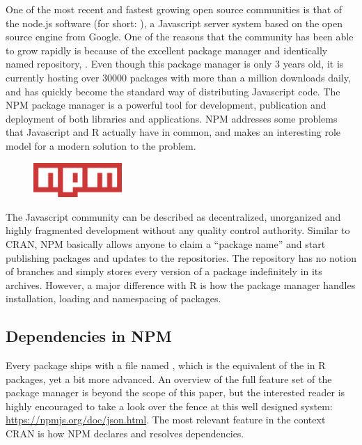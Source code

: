 One of the most recent and fastest growing open source communities is that of
the node.js software (for short: ), a Javascript server system based
on the open source engine  from Google. One of the reasons that the
community has been able to grow rapidly is because of the excellent package
manager and identically named repository, . Even though this package
manager is only 3 years old, it is currently hosting over 30000 packages with
more than a million downloads daily, and has quickly become the standard
way of distributing Javascript code. The NPM package manager is a powerful tool
for development, publication and deployment of both libraries and applications.
NPM addresses some problems that Javascript and R actually have in common, and
makes an interesting role model for a modern solution to the problem.\\

\begin{figure}[htbp]
  \centering
  \includegraphics[width=0.3\textwidth]{npm}
\end{figure}

\noindent The Javascript community can be described as decentralized,
unorganized and highly fragmented development without any quality control authority. Similar to
CRAN, NPM basically allows anyone to claim a ``package name'' and start
publishing packages and updates to the repositories. The repository has no
notion of branches and simply stores every version of a package indefinitely in
its archives. However, a major difference with R is how the package manager
handles installation, loading and namespacing of packages.

\subsection{Dependencies in NPM}

Every  package ships with a file named , which is
the equivalent of the  in R packages, yet a bit more advanced.
An overview of the full feature set of the package manager is beyond the scope
of this paper, but the interested reader is highly encouraged to take a look
over the fence at this well designed system: \url{https://npmjs.org/doc/json.html}.
The most relevant feature in the context CRAN is how NPM declares and resolves
dependencies.

